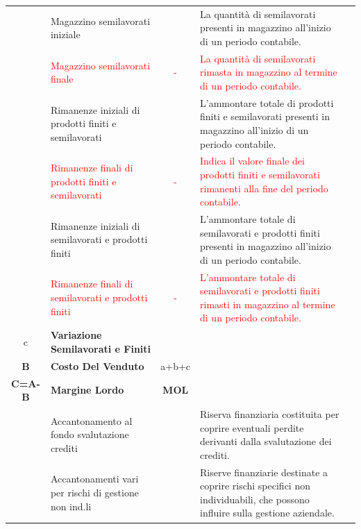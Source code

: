 \documentclass{article}
\newcommand{\RimanenzeFinaliProdottiFinitiSemilavorati}{Indica il valore finale dei prodotti finiti e semilavorati rimanenti alla fine del periodo contabile.}
\newcommand{\MagazzinoSemilavoratiIniziale}{La quantità di semilavorati presenti in magazzino all'inizio di un periodo contabile.}
\newcommand{\MagazzinoSemilavoratiFinale}{La quantità di semilavorati rimasta in magazzino al termine di un periodo contabile.}
\newcommand{\RimanenzeInizialiProdottiFinitiSemilavorati}{L'ammontare totale di prodotti finiti e semilavorati presenti in magazzino all'inizio di un periodo contabile.}
\newcommand{\RimanenzeInizialiSemilavoratiProdottiFiniti}{L'ammontare totale di semilavorati e prodotti finiti presenti in magazzino all'inizio di un periodo contabile.}
\newcommand{\RimanenzeFinaliSemilavoratiProdottiFiniti}{L'ammontare totale di semilavorati e prodotti finiti rimasti in magazzino al termine di un periodo contabile.}
\newcommand{\AccantonamentoFondoSvalutazioneCrediti}{Riserva finanziaria costituita per coprire eventuali perdite derivanti dalla svalutazione dei crediti.}
\newcommand{\AccantonamentiVariRischiGestioneNonIndividuabili}{Riserve finanziarie destinate a coprire rischi specifici non individuabili, che possono influire sulla gestione aziendale.}
\begin{document}
\begin{table}[ht]
{\begin{tabular}{|c l|c|l|c|}
                           & Magazzino semilavorati iniziale                                         &                    & \MagazzinoSemilavoratiIniziale                              &           \\
                           & \textcolor{red}{Magazzino semilavorati finale}                          & \textcolor{red}{-} & \textcolor{red}{\MagazzinoSemilavoratiFinale}               &           \\
                           & Rimanenze iniziali di prodotti finiti e semilavorati                    &                    & \RimanenzeInizialiProdottiFinitiSemilavorati                &           \\
                           & \textcolor{red}{Rimanenze finali di prodotti finiti e semilavorati}     & \textcolor{red}{-} & \textcolor{red}{\RimanenzeFinaliProdottiFinitiSemilavorati} &           \\
                           & Rimanenze iniziali di semilavorati e prodotti finiti                    &                    & \RimanenzeInizialiSemilavoratiProdottiFiniti                &           \\
                           & \textcolor{red}{Rimanenze finali di semilavorati e prodotti finiti}     & \textcolor{red}{-} & \textcolor{red}{\RimanenzeFinaliSemilavoratiProdottiFiniti} &           \\
            c              & \textbf{Variazione Semilavorati e Finiti}                               &                    &                                                             &           \\
            \textbf{B}     & \textbf{Costo Del Venduto}                                              & a+b+c              &                                                             &           \\
            \hline
            \textbf{C=A-B} & \textbf{Margine Lordo}                                                  & \textbf{MOL}       &                                                             &           \\
            \hline
                           & Accantonamento al fondo svalutazione crediti                            &                    & \AccantonamentoFondoSvalutazioneCrediti                     &           \\
                           & Accantonamenti vari per rischi di gestione non ind.li                   &                    & \AccantonamentiVariRischiGestioneNonIndividuabili           &           \\

\end{tabular}}
\end{table}
\end{document}

